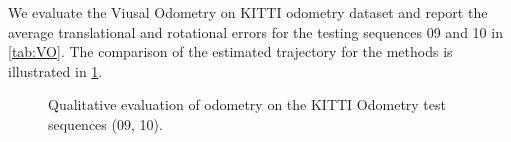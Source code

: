   We evaluate the Viusal Odometry on KITTI odometry dataset and report the average translational and rotational errors for the testing sequences 09 and 10 in \cref{tab:VO}.  The comparison of the estimated trajectory for the methods is illustrated in \cref{fig:VO}.


  \begin{figure}[t]
    \centering  
    \caption{Qualitative evaluation of odometry on the KITTI Odometry test sequences (09, 10).}
    \label{fig:VO}
  \end{figure}



